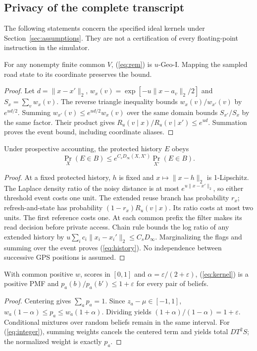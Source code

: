 \subsection{Privacy of the complete transcript}\label{sec:privacy}
The following statements concern the specified ideal kernels under
Section~\ref{sec:assumptions}. They are not a certification of every floating-point
instruction in the simulator.

\begin{proposition}\label{prop:rem}
For any nonempty finite common $V$, (\ref{eq:rem}) is $u$-Geo-I.
Mapping the sampled road state to its coordinate preserves the bound.
\end{proposition}
\begin{proof}
Let $d=\|x-x'\|_2$, $w_x(v)=\exp[-u\|x-a_v\|_2/2]$ and
$S_x=\sum_vw_x(v)$. The reverse triangle inequality bounds
$w_x(v)/w_{x'}(v)$ by $e^{ud/2}$. Summing
$w_{x'}(v)\le e^{ud/2}w_x(v)$ over the same domain bounds $S_{x'}/S_x$
by the same factor. Their product gives $R_u(v\mid x)/R_u(v\mid x')\le e^{ud}$.
Summation proves the event bound, including coordinate aliases.
\end{proof}

\begin{proposition}\label{prop:history}
Under prospective accounting, the protected history $E$ obeys
\begin{equation}
\Pr_X(E\in B)\le e^{C_sD_\infty(X,X')}\Pr_{X'}(E\in B). \label{eq:history}
\end{equation}
\end{proposition}
\begin{proof}
At a fixed protected history, $h$ is fixed and $x\mapsto\|x-h\|_2$ is
1-Lipschitz. The Laplace density ratio of the noisy distance is at most
$e^{u\|x-x'\|_2}$, so either threshold event costs one unit.
The extended reuse branch has probability $r_x$; refresh-and-state has
probability $(1-r_x)R_u(v\mid x)$. Its ratio costs at most two units.
The first reference costs one. At each common prefix the filter makes its
read decision before private access. Chain rule bounds the log ratio of any
extended history by $u\sum_i c_i\|x_i-x_i'\|_2\le C_sD_\infty$.
Marginalizing the flags and summing over the event proves (\ref{eq:history}).
No independence between successive GPS positions is assumed.
\end{proof}

\begin{proposition}\label{prop:kernel}
With common positive $w$, scores in $[0,1]$ and
$\alpha=\varepsilon/(2+\varepsilon)$, (\ref{eq:kernel}) is a positive PMF and
$p_a(b)/p_a(b')\le1+\varepsilon$ for every pair of beliefs.
\end{proposition}
\begin{proof}
Centering gives $\sum_ap_a=1$. Since $z_a-\mu\in[-1,1]$,
$w_a(1-\alpha)\le p_a\le w_a(1+\alpha)$. Dividing yields
$(1+\alpha)/(1-\alpha)=1+\varepsilon$. Conditional mixtures over random
beliefs remain in the same interval. For (\ref{eq:integer}), summing weights
cancels the centered term and yields total $DT^2S$; the normalized weight is
exactly $p_a$.
\end{proof}

